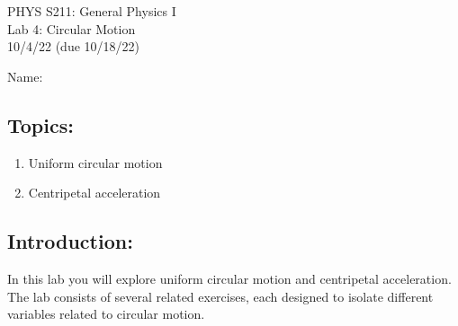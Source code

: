 \documentclass[11pt,letterpaper]{article}
\begin{document}
\setlength{\parindent}{0in}


\begin{flushright}
PHYS S211: General Physics I\\
Lab 4: Circular Motion\\
10/4/22 (due 10/18/22)
\end{flushright}

Name:

\subsection*{Topics:}
\begin{enumerate}
\setlength{\parskip}{3pt}
\item Uniform circular motion
\item Centripetal acceleration
\end{enumerate}

\subsection*{Introduction:}
In this lab you will explore uniform circular motion and centripetal acceleration. The lab consists of several related exercises, each designed to isolate different variables related to circular motion. 



\end{document}
